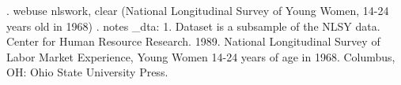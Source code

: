 . webuse nlswork, clear
(National Longitudinal Survey of Young Women, 14-24 years old in 1968)
{\smallskip}
. notes
{\smallskip}
_dta:
  1.  Dataset is a subsample of the NLSY data.  Center for Human Resource Research. 1989. National Longitudinal Survey of Labor Market Experience, Young Women 14-24 years of
      age in 1968. Columbus, OH: Ohio State University Press.
{\smallskip}

